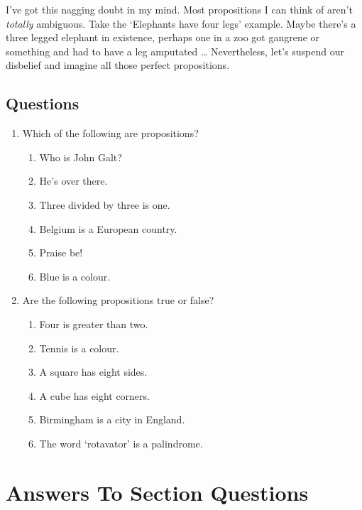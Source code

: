\documentclass{article}
\begin{document}
    I've got this nagging doubt in my mind. Most propositions I can think of
    aren't \emph{totally} ambiguous. Take the `Elephants have four legs'
    example. Maybe there's a three legged elephant in existence, perhaps one in
    a zoo got gangrene or something and had to have a leg amputated \ldots
    Nevertheless, let's suspend our disbelief and imagine all those perfect
    propositions.

    \subsection*{Questions}

      \begin{enumerate} 

        \item Which of the following are propositions?
          \begin{enumerate}
            \item Who is John Galt?
            \item He's over there.
            \item Three divided by three is one.
            \item Belgium is a European country.
            \item Praise be!
            \item Blue is a colour.
          \end{enumerate}

        \item Are the following propositions true or false?
          \begin{enumerate}
            \item Four is greater than two.
            \item Tennis is a colour.
            \item A square has eight sides.
            \item A cube has eight corners.
            \item Birmingham is a city in England.
            \item The word `rotavator' is a palindrome.
          \end{enumerate}

      \end{enumerate}

  \appendix
  \section{Answers To Section Questions}
\end{document}
